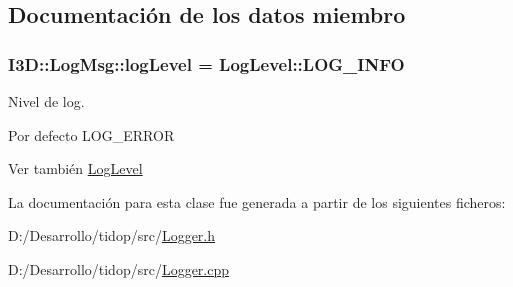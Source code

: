 \subsection{Documentación de los datos miembro}
\subsubsection[{\texorpdfstring{log\+Level}{logLevel}}]{ I3\+D\+::\+Log\+Msg\+::log\+Level = {\bf Log\+Level\+::\+L\+O\+G\+\_\+\+I\+N\+FO}\hspace{0.3cm}{\ttfamily [static]}}\hypertarget{class_i3_d_1_1_log_msg_a1a45bf0f5753da52a4a8ddf930c11ff8}{}\label{class_i3_d_1_1_log_msg_a1a45bf0f5753da52a4a8ddf930c11ff8}


Nivel de log. 

Por defecto L\+O\+G\+\_\+\+E\+R\+R\+OR \begin{DoxySeeAlso}{Ver también}
\hyperlink{namespace_i3_d_ae1af0f2e3b629610c45222809ff521f6}{Log\+Level} 
\end{DoxySeeAlso}


La documentación para esta clase fue generada a partir de los siguientes ficheros\+:\begin{DoxyCompactItemize}
\item 
D\+:/\+Desarrollo/tidop/src/\hyperlink{_logger_8h}{Logger.\+h}\item 
D\+:/\+Desarrollo/tidop/src/\hyperlink{_logger_8cpp}{Logger.\+cpp}\end{DoxyCompactItemize}
